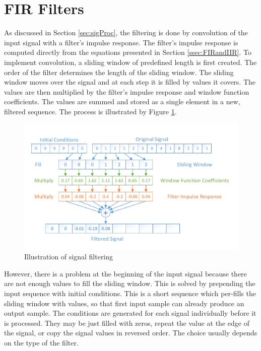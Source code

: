 \section{FIR Filters}
\label{sec:implFIRfilters}
As discussed in Section \ref{sec:sigProc}, the filtering is done by convolution of the input signal with a filter's impulse response. The filter's impulse response is computed directly from the equations presented in Section \ref{ssec:FIRandIIR}. To implement convolution, a sliding window of predefined length is first created. The order of the filter determines the length of the sliding window. The sliding window moves over the signal and at each step it is filled by values it covers. The values are then multiplied by the filter's impulse response and window function coefficients. The values are summed and stored as a single element in a new, filtered sequence. The process is illustrated by Figure \ref{fig:ImplFilter}.

\begin{figure}[htb]
	\centering
	\includegraphics[width=1\linewidth]{fig/implFilter.pdf}
	\caption{Illustration of signal filtering}
	\label{fig:ImplFilter}
\end{figure}

However, there is a problem at the beginning of the input signal because there are not enough values to fill the sliding window. This is solved by prepending the input sequence with initial conditions. This is a short sequence which per-fills the sliding window with values, so that first input sample can already produce an output sample. The conditions are generated for each signal individually before it is processed. They may be just filled with zeros, repeat the value at the edge of the signal, or copy the signal values in reversed order. The choice usually depends on the type of the filter.

